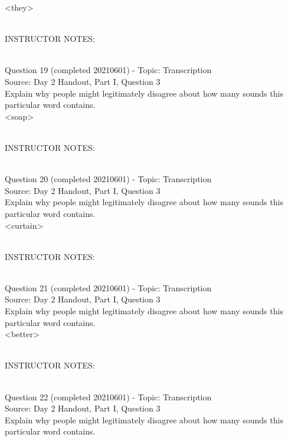 \documentclass[12pt]{article}
\begin{document}
<they>


~\\
INSTRUCTOR NOTES: 


~\\

{\large Question 19} (completed 20210601) - Topic: Transcription\\
Source: Day 2 Handout, Part I, Question 3\\

Explain why people might legitimately disagree about how many sounds this particular word contains.\\

<soap>


~\\
INSTRUCTOR NOTES: 


~\\

{\large Question 20} (completed 20210601) - Topic: Transcription\\
Source: Day 2 Handout, Part I, Question 3\\

Explain why people might legitimately disagree about how many sounds this particular word contains.\\

<curtain>


~\\
INSTRUCTOR NOTES: 


~\\

{\large Question 21} (completed 20210601) - Topic: Transcription\\
Source: Day 2 Handout, Part I, Question 3\\

Explain why people might legitimately disagree about how many sounds this particular word contains.\\

<better>


~\\
INSTRUCTOR NOTES: 


~\\

{\large Question 22} (completed 20210601) - Topic: Transcription\\
Source: Day 2 Handout, Part I, Question 3\\

Explain why people might legitimately disagree about how many sounds this particular word contains.\\
\end{document}
